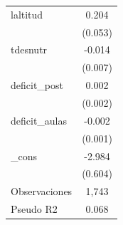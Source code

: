 {\begin{tabular}{l*{1}{c}}
\addlinespace
laltitud    &       0.204\sym{***}\\
            &     (0.053)         \\
\addlinespace
tdesnutr    &      -0.014\sym{**} \\
            &     (0.007)         \\
\addlinespace
deficit\_post&       0.002         \\
            &     (0.002)         \\
\addlinespace
deficit\_aulas&      -0.002         \\
            &     (0.001)         \\
\addlinespace
\_cons      &      -2.984\sym{***}\\
            &     (0.604)         \\
\midrule
Observaciones&       1,743         \\
Pseudo R2   &       0.068         \\
\bottomrule
\end{tabular}
}
